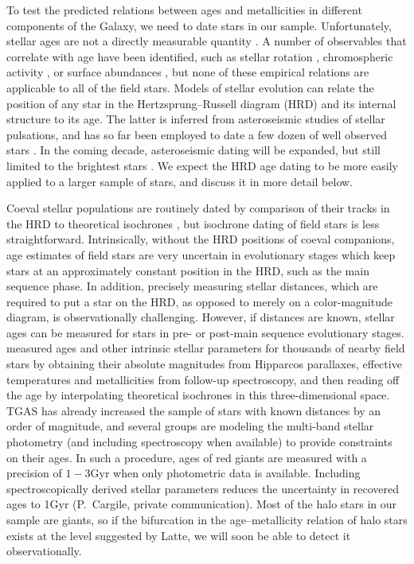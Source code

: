 \documentclass[apj, twocolappendix, numberedappendix, appendixfloats]{emulateapj}
\begin{document}
To test the predicted relations between ages and metallicities in different components of the Galaxy, we need to date stars in our sample.
Unfortunately, stellar ages are not a directly measurable quantity \citep[for a recent review, see][]{soderblom2010}.
A number of observables that correlate with age have been identified, such as stellar rotation \citep{barnes2007}, chromospheric activity \citep{mamajek2008}, or surface abundances \citep{ness2016}, but none of these empirical relations are applicable to all of the field stars.
Models of stellar evolution can relate the position of any star in the Hertzsprung--Russell diagram (HRD) and its internal structure to its age.
The latter is inferred from asteroseismic studies of stellar pulsations, and has so far been employed to date a few dozen of well observed stars \citep[e.g.,][]{keplerages}.
In the coming decade, asteroseismic dating will be expanded, but still limited to the brightest stars \citep{tess, plato}.
We expect the HRD age dating to be more easily applied to a larger sample of stars, and discuss it in more detail below.

Coeval stellar populations are routinely dated by comparison of their tracks in the HRD to theoretical isochrones \citep[e.g.,][]{sandage1970, chaboyer1998, dotter2007}, but isochrone dating of field stars is less straightforward.
Intrinsically, without the HRD positions of coeval companions, age estimates of field stars are very uncertain in evolutionary stages which keep stars at an approximately constant position in the HRD, such as the main sequence phase.
In addition, precisely measuring stellar distances, which are required to put a star on the HRD, as opposed to merely on a color-magnitude diagram, is observationally challenging.
However, if distances are known, stellar ages can be measured for stars in pre- or post-main sequence evolutionary stages.
\citet{gcs} measured ages and other intrinsic stellar parameters for thousands of nearby field stars by obtaining their absolute magnitudes from Hipparcos parallaxes, effective temperatures and metallicities from follow-up spectroscopy, and then reading off the age by interpolating theoretical isochrones in this three-dimensional space.
TGAS has already increased the sample of stars with known distances by an order of magnitude, and several groups are modeling the multi-band stellar photometry (and including spectroscopy when available) to provide constraints on their ages.
In such a procedure, ages of red giants are measured with a precision of $1-3$\;Gyr when only photometric data is available.
Including spectroscopically derived stellar parameters reduces the uncertainty in recovered ages to 1\;Gyr (P.~Cargile, private communication).
Most of the halo stars in our sample are giants, so if the bifurcation in the age--metallicity relation of halo stars exists at the level suggested by Latte, we will soon be able to detect it observationally.
\end{document}
